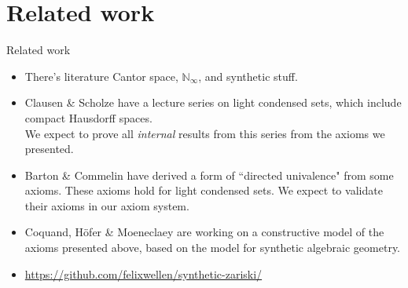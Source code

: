 \documentclass{beamer}
\begin{document}
\section{Related work}
\begin{frame}{Related work}
  \begin{itemize}
    \item There's literature 
      Cantor space, $\mathbb N_\infty$, 
      and synthetic stuff. %
    \pause 
    \item 
    Clausen \& Scholze have a lecture series on light condensed sets, which include compact Hausdorff spaces. \\
    \pause
    We expect to prove all \textit{internal} 
    results from this series from the axioms we presented. 
  \pause 
    \item 
      Barton \& Commelin have derived a form of ``directed univalence" from some axioms. \pause
      These axioms hold for light condensed sets. \pause
      We expect to validate their axioms in our axiom system. 
      \pause
    \item 
    Coquand, H\"ofer \& Moeneclaey are working on a 
    constructive model of the axioms presented above, 
    based on the model for synthetic algebraic geometry. 
    \pause 
  \item \url{https://github.com/felixwellen/synthetic-zariski/}
\end{itemize}
\end{frame}

\end{document}
